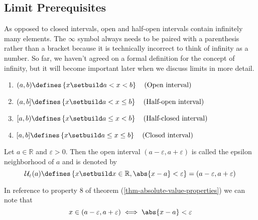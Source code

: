 \subsection{Limit Prerequisites}\label{subsec-limit-prerequisites}

\begin{definition}\label{def-interval-notation}
    As opposed to closed intervals, open and half-open intervals contain infinitely
    many elements. The $\infty$ symbol always needs to be paired with a parenthesis
    rather than a bracket because it is technically incorrect to think of infinity
    as a number. So far, we haven't agreed on a formal definition for the concept
    of infinity, but it will become important later when we discuss limits in more
    detail.
    \begin{enumerate}
        \item $(a,b)\defines\left\{x\setbuild a < x < b\right\}       \quad \text{(Open interval)}$
        \item $(a,b]\defines\left\{x\setbuild a < x \leq b\right\}    \quad \text{(Half-open interval)}$
        \item $[a,b)\defines\left\{x\setbuild a \leq x < b\right\}    \quad \text{(Half-closed interval)}$
        \item $[a,b]\defines\left\{x\setbuild a \leq x \leq b\right\} \quad \text{(Closed interval)}$
    \end{enumerate}
\end{definition}

\begin{definition}\label{def-epsilon-neighborhood}
    Let $a\in\mathbb{R}$ and $\varepsilon > 0$. Then the open interval 
    $(a-\varepsilon,a+\varepsilon)$ is called the epsilon neighborhood of $a$
    and is denoted by
    \begin{equation}
        \mathcal{U}_\varepsilon(a)\defines
        \left\{x \setbuild x\in\mathbb{R},\abs{x-a}<\varepsilon \right\}=
        (a-\varepsilon,a+\varepsilon)
    \end{equation}
\end{definition}

\begin{rem}\label{rem-epsilon-neighborhood}
    In reference to property 8 of theorem (\ref{thm-absolute-value-properties})
    we can note that
    \begin{equation}
        x\in(a-\varepsilon,a+\varepsilon) \iff \abs{x-a} < \varepsilon
    \end{equation}
\end{rem}

